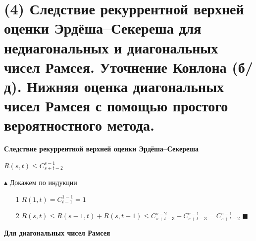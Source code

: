 \section{(4) Следствие рекуррентной верхней оценки Эрдёша–Секереша для недиагональных и диагональных чисел Рамсея. Уточнение Конлона (б/д). Нижняя оценка диагональных чисел Рамсея с
помощью простого вероятностного метода.}
\textbf{Следствие рекуррентной верхней оценки Эрдёша–Секереша}
\begin{center}
$R(s,t) \leq C_{s+t-2}^{s-1}$ 
\end{center}
$\blacktriangle$ Докажем по индукции
\begin{itemize}
    \item [1] $R(1,t) = C_{t-1}^{1-1} = 1$
    \item[2] $R(s,t) \leq R(s-1, t) + R(s, t-1) \leq C_{s+t-3}^{s-2} + C_{s+t-3}^{s-1} = C_{s+t-2}^{s-1}$ $\blacksquare$
\end{itemize}

\textbf{Для диагональных чисел Рамсея}

